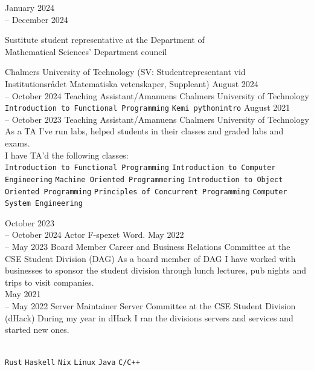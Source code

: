 \documentclass[9pt]{developercv}
\begin{document}
\begin{entrylist}
	\entry
		{January 2024 \\-- December 2024}
		{
			\begin{minipage}[t]{0.5\textwidth}
				Sustitute student representative at the Department of \\
				Mathematical Sciences' Department council
			\end{minipage}
		}
		{Chalmers University of Technology}
		{(SV: Studentrepresentant vid Institutionsrådet Matematiska vetenskaper, Suppleant)}
	\entry
		{August 2024 \\-- October 2024}
		{Teaching Assistant/Amanuens}
		{Chalmers University of Technology}
		{
			\texttt{Introduction to Functional Programming}\slashsep
			\texttt{Kemi pythonintro}
		}
		{August 2021 \\-- October 2023}
		{Teaching Assistant/Amanuens}
		{Chalmers University of Technology}
		{
			As a TA I've run labs, helped students in their classes and
			graded labs and exams.\\ I have TA'd the following classes:\\
			\texttt{Introduction to Functional Programming}\slashsep
			\texttt{Introduction to Computer Engineering}\slashsep
			\texttt{Machine Oriented Programmering}\slashsep
			\texttt{Introduction to Object Oriented Programming}\slashsep
			\texttt{Principles of Concurrent Programming}\slashsep
			\texttt{Computer System Engineering}
		}
\end{entrylist}
\begin{entrylist}
	\entry
		{October 2023 \\-- October 2024}
		{Actor}
		{F-spexet}
		{
			Word.
		}
	\entry
		{May 2022 \\-- May 2023}
		{Board Member}
		{Career and Business Relations Committee at the CSE Student Division (DAG)}
		{
			As a board member of DAG I have worked with
			businesses to sponsor the student division through
			lunch lectures, pub nights and trips to visit
			companies.\\
		}
	\entry
		{May 2021 \\-- May 2022}
		{Server Maintainer}
		{Server Committee at the CSE Student Division (dHack)}
		{
			During my year in dHack I ran the divisions servers and services and started new ones.\\
		}
\end{entrylist}
\hfill\\
	{
		\texttt{Rust}\slashsep
		\texttt{Haskell}\slashsep
		\texttt{Nix}\slashsep
		\texttt{Linux}\slashsep
		\texttt{Java}\slashsep
		\texttt{C/C++}
	}\\
\end{document}
